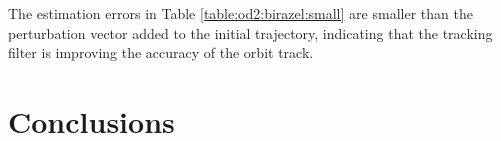 \documentclass[conference]{IEEEtran}
\begin{document}


The estimation errors in Table \ref{table:od2:birazel:small} are smaller than the perturbation vector added to the initial trajectory, indicating that the tracking filter is improving the accuracy of the orbit track.

\section{Conclusions} \label{section:conclusions}
\end{document}
